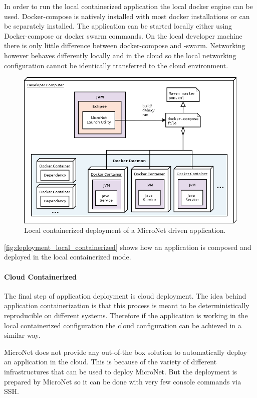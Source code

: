 In order to run the local containerized application the local docker engine can
be used. Docker-compose is natively installed with most docker installations or
can be separately installed. The application can be started locally either using
Docker-compose or docker swarm commands. On the local developer machine there is
only little difference between docker-compose and -swarm. Networking however
behaves differently locally and in the cloud so the local networking
configuration cannot be identically transferred to the cloud environment.

\begin{figure}
	\centering
	\includegraphics[width=\textwidth]{images/architecture/DeploymentLocalContainerized}
	\caption{Local containerized deployment of a MicroNet driven application.}
	\label{fig:deployment_local_containerized}
\end{figure}

\autoref{fig:deployment_local_containerized} shows how an application is
composed and deployed in the local containerized mode.

\paragraph{Cloud Containerized}

The final step of \ms{} application deployment is cloud deployment. The idea
behind application containerization is that this process is meant to be
deterministically reproducible on different systems. Therefore if the
application is working in the local containerized configuration the cloud
configuration can be achieved in a similar way.

MicroNet does not provide any out-of-the box solution to automatically deploy an
application in the cloud. This is because of the variety of
different infrastructures that can be used to deploy MicroNet. But the
deployment is prepared by MicroNet so it can be done with very few console
commands via SSH.


